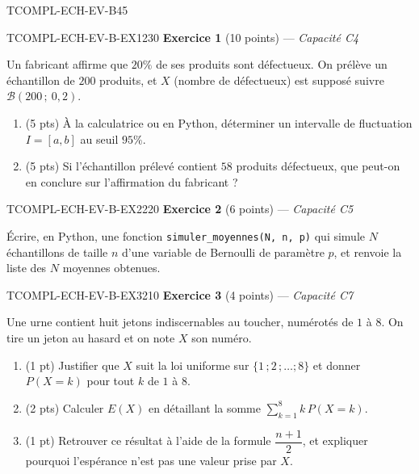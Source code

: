 \begin{evaluation}{TCOMPL-ECH-EV-B}{45}

\begin{exercice}{TCOMPL-ECH-EV-B-EX1}{2}{30}
\textbf{Exercice 1} (10 points) --- \textit{Capacité C4}

\medskip

Un fabricant affirme que $20\%$ de ses produits sont défectueux. On prélève un échantillon de $200$ produits, et $X$ (nombre de défectueux) est supposé suivre $\mathcal{B}(200\,;\ 0{,}2)$.
\begin{enumerate}
  \item (5 pts) À la calculatrice ou en Python, déterminer un intervalle de fluctuation $I=[a,b]$ au seuil $95\%$.
  \item (5 pts) Si l'échantillon prélevé contient $58$ produits défectueux, que peut-on en conclure sur l'affirmation du fabricant ?
\end{enumerate}
\end{exercice}

\begin{exercice}{TCOMPL-ECH-EV-B-EX2}{2}{20}
\textbf{Exercice 2} (6 points) --- \textit{Capacité C5}

\medskip

Écrire, en Python, une fonction \texttt{simuler\_moyennes(N, n, p)} qui simule $N$ échantillons de taille $n$ d'une variable de Bernoulli de paramètre $p$, et renvoie la liste des $N$ moyennes obtenues.
\end{exercice}

\begin{exercice}{TCOMPL-ECH-EV-B-EX3}{2}{10}
\textbf{Exercice 3} (4 points) --- \textit{Capacité C7}

\medskip

Une urne contient huit jetons indiscernables au toucher, numérotés de $1$ à $8$. On tire un jeton au hasard et on note $X$ son numéro.
\begin{enumerate}
  \item (1 pt) Justifier que $X$ suit la loi uniforme sur $\{1\,;2\,;\dots;8\}$ et donner $P(X=k)$ pour tout $k$ de $1$ à $8$.
  \item (2 pts) Calculer $E(X)$ en détaillant la somme $\sum_{k=1}^{8} k\,P(X=k)$.
  \item (1 pt) Retrouver ce résultat à l'aide de la formule $\dfrac{n+1}{2}$, et expliquer pourquoi l'espérance n'est pas une valeur prise par $X$.
\end{enumerate}
\end{exercice}

\end{evaluation}
